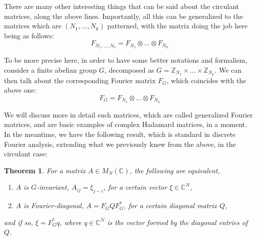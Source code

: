 \documentclass[12pt]{amsbook}
\newtheorem{theorem}{Theorem}[chapter]
\begin{document}
There are many other interesting things that can be said about the circulant matrices, along the above lines. Importantly, all this can be generalized to the matrices which are $(N_1,\ldots,N_k)$ patterned, with the matrix doing the job here being as follows:
$$F_{N_1,\ldots,N_k}=F_{N_1}\otimes\ldots\otimes F_{N_k}$$

To be more precise here, in order to have some better notations and formalism, consider a finite abelian group $G$, decomposed as $G=\mathbb Z_{N_1}\times\ldots\times\mathbb Z_{N_k}$. We can then talk about the corresponding Fourier matrix $F_G$, which coincides with the above one:
$$F_G=F_{N_1}\otimes\ldots\otimes F_{N_k}$$

We will discuss more in detail such matrices, which are called generalized Fourier matrices, and are basic examples of complex Hadamard matrices, in a moment. In the meantime, we have the following result, which is standard in discrete Fourier analysis, extending what we previously knew from the above, in the circulant case:


\begin{theorem}
For a matrix $A\in M_N(\mathbb C)$, the following are equivalent,
\begin{enumerate}
\item $A$ is $G$-invariant, $A_{ij}=\xi_{j-i}$, for a certain vector $\xi\in\mathbb C^N$,

\item $A$ is Fourier-diagonal, $A=F_GQF_G^*$, for a certain diagonal matrix $Q$,
\end{enumerate}
and if so, $\xi=F_G^*q$, where $q\in\mathbb C^N$ is the vector formed by the diagonal entries of $Q$.
\end{theorem}
\end{document}
